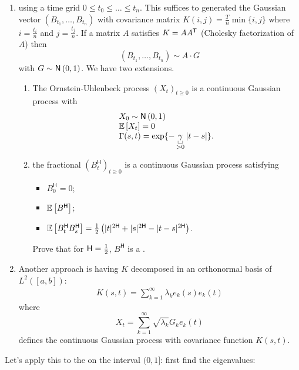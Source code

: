 \documentclass[12pt]{report}
\begin{document}
\begin{enumerate}
	\item using a time grid $0\leq t_{0}\leq\ldots\leq t_{n}$. This suffices to generated the Gaussian vector $(B_{t_{1}},\ldots,B_{t_{n}})$ with covariance matrix $K(i,j)=\frac{T}{n}\min\{i,j\}$ where $i=\frac{t_{i}}{n}$ and $j=\frac{t_{j}}{n}$. If a matrix $A$ satisfies $K=AA^{\mathsf{T}}$ (Cholesky factorization of $A$) then 
	\begin{equation*}
		(B_{t_{1}},\ldots,B_{t_{n}})\sim A\cdot G
	\end{equation*}
	with $G\sim\mathsf{N}\left(0,1\right)$. We have two extensions.
	\begin{enumerate}
		\item The Ornstein-Uhlenbeck process ${(X_{t})}_{t\geq0}$ is a continuous Gaussian process with 
		\begin{equation*}
			\begin{array}{l}
				X_{0}\distnorm{0,1}\\
				\ev{X_{t}}=0\\
				\Gamma(s,t)=\exp\{-\ubracketthin{\gamma}_{>0}|t-s|\}.
			\end{array}
		\end{equation*}
		\item the fractional \bwm ${(B_{t}^{\mathsf{H}})}_{t\geq0}$ is a continuous Gaussian process satisfying 
		\begin{itemize}
			\item $B^{\mathsf{H}}_{0}=0$;
			\item $\mathbb{E}\left[B^{\mathsf{H}}\right]$;
			\item $\mathbb{E}\left[B_{t}^{\mathsf{H}}B_{s}^{\mathsf{H}}\right]=\frac{1}{2}\left(|t|^{2\mathsf{H}}+|s|^{2\mathsf{H}}-|t-s|^{2\mathsf{H}}\right)$.
		\end{itemize} 
		Prove that for $\mathsf{H}=\frac{1}{2}$, $B^{\mathsf{H}}$ is a \bwm.
	\end{enumerate}
	\item Another approach is having $K$ decomposed in an orthonormal basis of $L^{2}([a,b])$:
	\begin{align*}
		K(s,t)=\sum_{k=1}^{\infty}\lambda_ke_k(s)e_k(t)
	\end{align*}
	where
	\begin{equation*}
		X_t=\sum_{k=1}^{\infty}\sqrt{\lambda_k}G_ke_k(t)
	\end{equation*}
	defines the continuous Gaussian process with covariance function $K(s,t)$.
\end{enumerate}
Let's apply this to the \bwm{} on the interval $(0,1]$: first find the eigenvalues:
\end{document}
